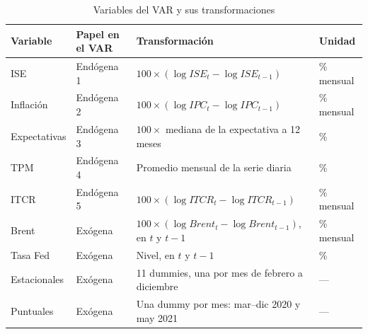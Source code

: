 \begin{table}[H]
\centering
\caption{Variables del VAR y sus transformaciones}
\label{tab:transformaciones}
\small
\begin{tabular}{@{}llll@{}}
\toprule
Variable & Papel en el VAR & Transformación & Unidad \\
\midrule
ISE & Endógena 1 & $100 \times (\log ISE_t - \log ISE_{t-1})$ & \% mensual \\
Inflación & Endógena 2 & $100 \times (\log IPC_t - \log IPC_{t-1})$ & \% mensual \\
Expectativas & Endógena 3 & $100 \times$ mediana de la expectativa a 12 meses & \% \\
TPM & Endógena 4 & Promedio mensual de la serie diaria & \% \\
ITCR & Endógena 5 & $100 \times (\log ITCR_t - \log ITCR_{t-1})$ & \% mensual \\
Brent & Exógena & $100 \times (\log Brent_t - \log Brent_{t-1})$, en $t$ y $t-1$ & \% mensual \\
Tasa Fed & Exógena & Nivel, en $t$ y $t-1$ & \% \\
Estacionales & Exógena & 11 dummies, una por mes de febrero a diciembre & --- \\
Puntuales & Exógena & Una dummy por mes: mar--dic 2020 y may 2021 & --- \\
\bottomrule
\end{tabular}
\end{table}
